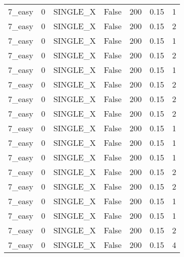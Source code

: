 \begin{tabular}{lrllrrr}
 7\_easy        &              0 & SINGLE\_X        & False           &          200 &   0.15 &               1 \\
 7\_easy        &              0 & SINGLE\_X        & False           &          200 &   0.15 &               2 \\
 7\_easy        &              0 & SINGLE\_X        & False           &          200 &   0.15 &               1 \\
 7\_easy        &              0 & SINGLE\_X        & False           &          200 &   0.15 &               2 \\
 7\_easy        &              0 & SINGLE\_X        & False           &          200 &   0.15 &               1 \\
 7\_easy        &              0 & SINGLE\_X        & False           &          200 &   0.15 &               2 \\
 7\_easy        &              0 & SINGLE\_X        & False           &          200 &   0.15 &               2 \\
 7\_easy        &              0 & SINGLE\_X        & False           &          200 &   0.15 &               2 \\
 7\_easy        &              0 & SINGLE\_X        & False           &          200 &   0.15 &               1 \\
 7\_easy        &              0 & SINGLE\_X        & False           &          200 &   0.15 &               1 \\
 7\_easy        &              0 & SINGLE\_X        & False           &          200 &   0.15 &               1 \\
 7\_easy        &              0 & SINGLE\_X        & False           &          200 &   0.15 &               2 \\
 7\_easy        &              0 & SINGLE\_X        & False           &          200 &   0.15 &               2 \\
 7\_easy        &              0 & SINGLE\_X        & False           &          200 &   0.15 &               1 \\
 7\_easy        &              0 & SINGLE\_X        & False           &          200 &   0.15 &               1 \\
 7\_easy        &              0 & SINGLE\_X        & False           &          200 &   0.15 &               2 \\
 7\_easy        &              0 & SINGLE\_X        & False           &          200 &   0.15 &               4 \\

\end{tabular}
